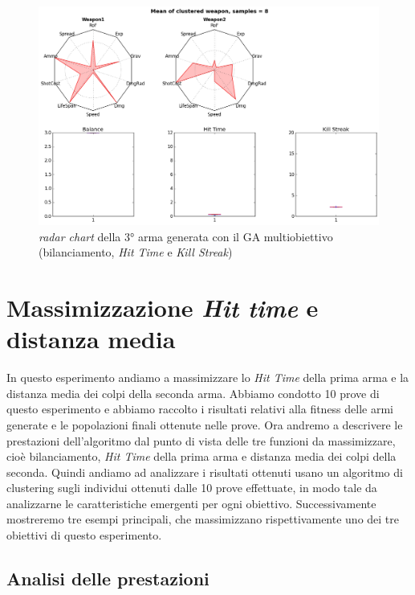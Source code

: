 \documentclass[12pt, italian]{toptesi}
\begin{document}
\begin{figure}[tp]
\centering
\includegraphics[width=1.0\textwidth]{rad_delta_kill_3}
\caption{\emph{radar chart} della 3° arma generata con il GA multiobiettivo (bilanciamento, \emph{Hit Time} e \emph{Kill Streak})}
\label{fig:rad_delta_kill_3}
\end{figure}

\section{Massimizzazione \emph{Hit time} e distanza media}
In questo esperimento andiamo a massimizzare lo \emph{Hit Time} della prima arma e la distanza media dei colpi della seconda arma.
Abbiamo condotto 10 prove di questo esperimento e abbiamo raccolto i risultati relativi alla fitness delle armi generate e le popolazioni finali ottenute nelle prove.
Ora andremo a descrivere le prestazioni dell'algoritmo dal punto di vista delle tre funzioni da massimizzare, cioè bilanciamento, \emph{Hit Time} della prima arma e distanza media dei colpi della seconda.
Quindi andiamo ad analizzare i risultati ottenuti usano un algoritmo di clustering sugli individui ottenuti dalle 10 prove effettuate, in modo tale da analizzarne le caratteristiche emergenti per ogni obiettivo.
Successivamente mostreremo tre esempi principali, che massimizzano rispettivamente uno dei tre obiettivi di questo esperimento.

\subsection{Analisi delle prestazioni}
\label{sec:delta_dist_prest}
\end{document}
